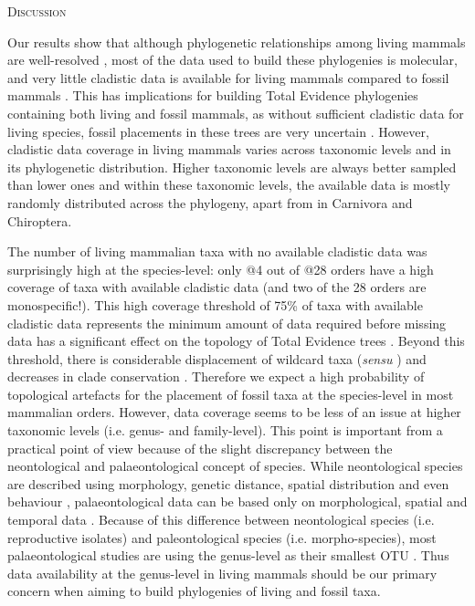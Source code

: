\documentclass[12pt,letterpaper]{article}
\renewcommand{\section}[1]{%
\bigskip
\begin{center}
\begin{Large}
\normalfont\scshape #1
\medskip
\end{Large}
\end{center}}
\begin{document}
%
%

\section{Discussion}
Our results show that although phylogenetic relationships among living mammals are well-resolved \citep[e.g.][]{FritzTree,meredithimpacts2011,May-Collado-PeerJ}, most of the data used to build these phylogenies is molecular, and very little cladistic data is available for living mammals compared to fossil mammals \citep[e.g.][]{O'Leary08022013,ni2013oldest}.
This has implications for building Total Evidence phylogenies containing both living and fossil mammals, as without sufficient cladistic data for living species, fossil placements in these trees are very uncertain \citep{GuillermeCooper}.
However, cladistic data coverage in living mammals varies across taxonomic levels and in its phylogenetic distribution.
Higher taxonomic levels are always better sampled than lower ones and within these taxonomic levels, the available data is mostly randomly distributed across the phylogeny, apart from in Carnivora and Chiroptera.

The number of living mammalian taxa with no available cladistic data was surprisingly high at the species-level: only @4 out of @28 orders have a high coverage of taxa with available cladistic data (and two of the 28 orders are monospecific!).
This high coverage threshold of 75\% of taxa with available cladistic data represents the minimum amount of data required before missing data has a significant effect on the topology of Total Evidence trees \citep{GuillermeCooper}.
Beyond this threshold, there is considerable displacement of wildcard taxa (\textit{sensu} \citep{kearneyfragmentary2002}) and decreases in clade conservation \citep{GuillermeCooper}.
Therefore we expect a high probability of topological artefacts for the placement of fossil taxa at the species-level in most mammalian orders.
However, data coverage seems to be less of an issue at higher taxonomic levels (i.e. genus- and family-level).
This point is important from a practical point of view because of the slight discrepancy between the neontological and palaeontological concept of species.
While neontological species are described using morphology, genetic distance, spatial distribution and even behaviour \citep[e.g.][]{kellymolecular2014}, palaeontological data can be based only on morphological, spatial and temporal data \citep[e.g.][]{ni2013oldest}.
Because of this difference between neontological species (i.e. reproductive isolates) and paleontological species (i.e. morpho-species), most palaeontological studies are using the genus-level as their smallest OTU \citep[e.g.][]{ni2013oldest,O'Leary08022013}.
Thus data availability at the genus-level in living mammals should be our primary concern when aiming to build phylogenies of living and fossil taxa.
\end{document}
